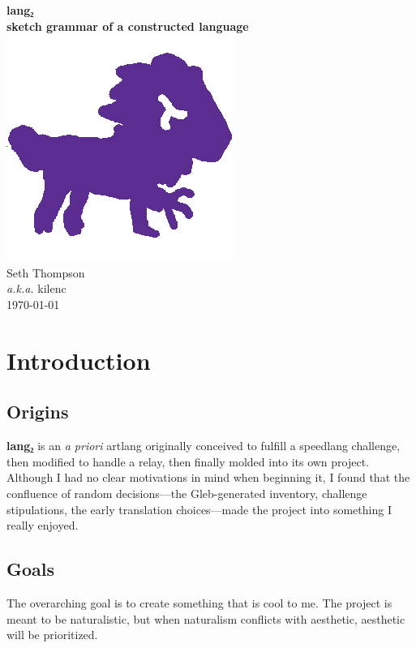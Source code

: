 \documentclass[fontsize=12pt,twoside=false,numbers=noenddot]{class/kaobook}
\title[\langname{} Grammar]{\langname{}}
\subtitle{a grammar of a constructed language}
\author{kilenc}
\date{\today}
\newcommand{\langname}{\textbf{lang₂}}
\renewcommand{\bf}{\bfseries}
\begin{document}
\frontmatter

\begin{titlepage} \centering
	\hspace{0pt} \vfill
	{\huge \langname{} } \\\medbreak 
	{\large \bf sketch grammar of a constructed language} \\\bigbreak
	\includegraphics[width=0.25\linewidth]{lang2-lion.png} \\\bigbreak
	{\large Seth Thompson \\ \small \emph{a.k.a.} kilenc} \\\bigbreak
	{\small \today}
	\vfill \hspace{0pt}
\end{titlepage}

\setlength{\textheight}{23cm} %
\etocstandarddisplaystyle %
\etocstandardlines %
\tableofcontents 


\setchapterpreamble[u]{\margintoc}
\chapter{Introduction}
\section{Origins}
\langname{} is an \emph{a priori} artlang originally conceived to fulfill a speedlang challenge, then modified to handle a relay, then finally molded into its own project. Although I had no clear motivations in mind when beginning it, I found that the confluence of random decisions---the Gleb-generated inventory, challenge stipulations, the early translation choices---made the project into something I really enjoyed.

\section{Goals}
The overarching goal is to create something that is cool to me. The project is meant to be naturalistic, but when naturalism conflicts with aesthetic, aesthetic will be prioritized.
\end{document}

